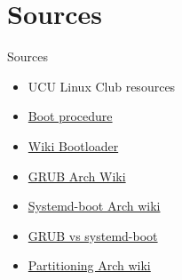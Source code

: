 \documentclass[usenames,dvipsnames,10pt,aspectratio=169]{beamer}
\begin{document}
\section{Sources}
\begin{frame}{Sources}
    \begin{itemize}
        \item UCU Linux Club resources
        \item \href{https://www.freecodecamp.org/news/uefi-vs-bios/}{Boot procedure}
        \item \href{https://en.wikipedia.org/wiki/Bootloader}{Wiki Bootloader}
        \item \href{https://wiki.archlinux.org/title/GRUB}{GRUB Arch Wiki}
        \item \href{https://wiki.archlinux.org/title/Systemd-boot}{Systemd-boot Arch wiki}
        \item \href{https://www.maketecheasier.com/grub-vs-systemd-boot/}{GRUB vs systemd-boot}
        \item \href{https://wiki.archlinux.org/title/Partitioning}{Partitioning Arch wiki}
    \end{itemize}
\end{frame}
\end{document}
